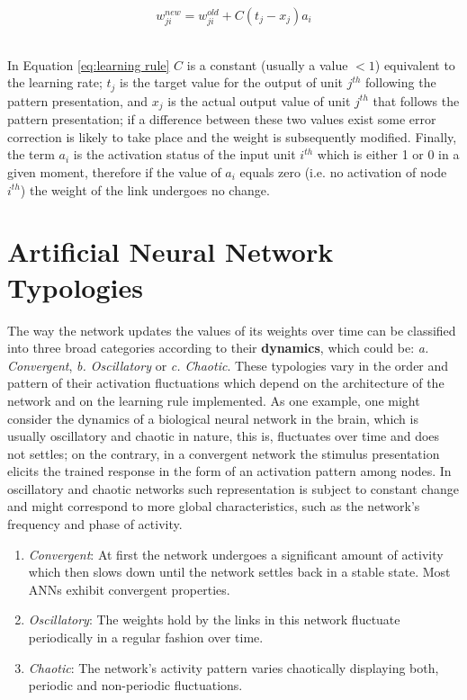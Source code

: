 \documentclass{WileySev}
\begin{document}
\begin{equation}
w_{ji}^{\textit{new}}=w_{ji}^{\textit{old}}+C(t_j-x_j)a_i \label{eq:learning rule}
\end{equation}
\

In Equation \ref{eq:learning rule} $C$ is a constant (usually a value $< 1$) equivalent to the learning rate; $t_j$ is the target value for the output of unit $j^{th}$ following the pattern presentation, and $x_j$ is the actual output value of unit $j^{th}$ that follows the pattern presentation; if a difference between these two values exist some error correction is likely to take place and the weight is subsequently modified. Finally, the term $a_i$ is the activation status of the input unit $i^{th}$ which is either 1 or 0 in a given moment, therefore if the value of $a_i$ equals zero (i.e. no activation of node $i^{th}$) the weight of the link undergoes no change.

\section{Artificial Neural Network Typologies}

The way the network  updates the values of its weights over time can be classified into three broad categories according to their \textbf{dynamics}, which could be: \textit{a. Convergent}, \textit{b. Oscillatory} or \textit{c. Chaotic}. These typologies vary in the order and pattern of their activation fluctuations which depend on the architecture of the network and on the learning rule implemented. As one example, one might consider the dynamics of a biological neural network in the brain, which is usually oscillatory and chaotic in nature, this is, fluctuates over time and does not settles; on the contrary, in a convergent network the stimulus presentation elicits the trained response in the form of an activation pattern among nodes. In oscillatory and chaotic networks such representation is subject to constant change and might correspond to more global characteristics, such as the network’s frequency and phase of activity.

\begin{enumerate}
  \item{\textit{Convergent}: At first the network undergoes a significant amount of activity which then slows down until the network settles back in a stable state. Most ANNs exhibit convergent properties.}
  \item{\textit{Oscillatory}: The weights hold by the links in this network fluctuate periodically in a regular fashion over time.}
  \item{\textit{Chaotic}: The network's activity pattern varies chaotically displaying both, periodic and non-periodic fluctuations.}
\end{enumerate}
\end{document}
